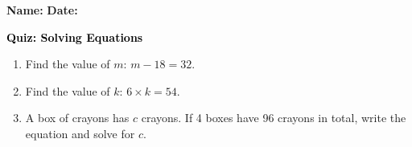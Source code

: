 \documentclass[12pt, letterpaper, fleqn]{article}
\begin{document}
\textbf{Name:} \underline{\hspace{5cm}}
\hfill
\textbf{Date:} \underline{\hspace{3cm}}\\

\begin{tcolorbox}[colback=customteal!20]
    \large\textcolor{black}{\textbf{Quiz: Solving Equations}}
\end{tcolorbox}
\begin{enumerate}[itemsep=3.5cm, leftmargin=0.6cm]
\item Find the value of $m$: $m - 18 = 32$.
\vspace{3cm}
\item Find the value of $k$: $6 \times k = 54$.
\vspace{3cm}
\item A box of crayons has $c$ crayons. If 4 boxes have 96 crayons in total, write the equation and solve for $c$.
\end{enumerate}
\end{document}
